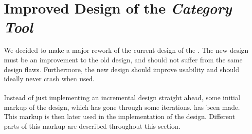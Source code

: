 \section{Improved Design of the \emph{Category Tool}}
\label{sec:improved_design}


We decided to make a major rework of the current design of the \ct. The new design must be an improvement to the old design, and should not suffer from the same design flaws. Furthermore, the new design should improve usability and should ideally never crash when used.
\\\\
Instead of just implementing an incremental design straight ahead, some initial markup of the design, which has gone through some iterations, has been made. This markup is then later used in the implementation of the design. Different parts of this markup are described throughout this section.

